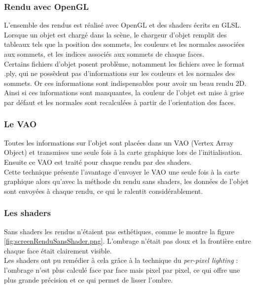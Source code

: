\subsubsection{Rendu avec OpenGL}
L'ensemble des rendus est réalisé avec OpenGL et des shaders écrits en GLSL. Lorsque un objet est chargé dans la scène, le chargeur d'objet remplit des tableaux tels que la position des sommets, les couleurs et les normales associées aux sommets, et les indices associés aux sommets de chaque faces.\\
Certains fichiers d'objet posent problème, notamment les fichiers avec le format .ply, qui ne possèdent pas d'informations sur les couleurs et les normales des sommets. Or ces informations sont indispensables pour avoir un beau rendu 2D. Ainsi si ces informations sont manquantes, la couleur de l'objet est mise à grise par défaut et les normales sont recalculées à partir de l'orientation des faces.


\subsubsection{Le VAO}
Toutes les informations sur l'objet sont placées dans un VAO (Vertex Array Object) et transmises une seule fois à la carte graphique lors de l'initialisation. Ensuite ce VAO est traité pour chaque rendu par des shaders.\\
Cette technique présente l'avantage d'envoyer le VAO une seule fois à la carte graphique alors qu'avec la méthode du rendu sans shaders, les données de l'objet sont envoyées à chaque rendu, ce qui le ralentit considérablement.

\subsubsection{Les shaders}
Sans shaders les rendus n'étaient pas esthétiques, comme le montre la figure \ref{fig:screenRenduSansShader.png}. L'ombrage n'était pas doux et la frontière entre chaque face était clairement visible.\\
Les shaders ont pu remédier à cela grâce à la technique du \textit{per-pixel lighting} : l'ombrage n'est plus calculé face par face mais pixel par pixel, ce qui offre une plus grande précision et ce qui permet de lisser l'ombre.\\


